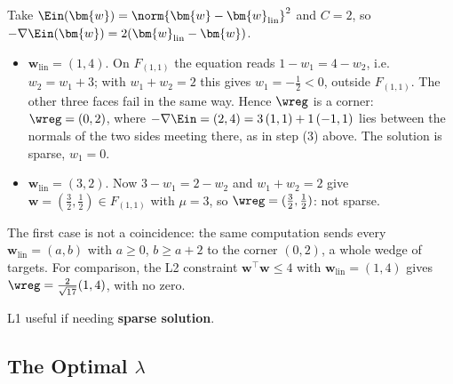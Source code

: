 \begin{eg}
    Take \(\Ein(\bm{w}) = \norm{\bm{w} - \bm{w}_{\mathrm{lin}}}^2\) and \(C =
    2\), so \(-\nabla \Ein(\bm{w}) = 2(\bm{w}_{\mathrm{lin}} - \bm{w})\).
    \begin{itemize}
        \item \(\bm{w}_{\mathrm{lin}} = (1, 4)\). On \(F_{(1,1)}\) the equation
            reads \(1 - w_1 = 4 - w_2\), i.e.\ \(w_2 = w_1 + 3\); with \(w_1 +
            w_2 = 2\) this gives \(w_1 = -\frac{1}{2} < 0\), outside
            \(F_{(1,1)}\). The other three faces fail in the same way. Hence
            \(\wreg\) is a corner: \(\wreg = (0, 2)\), where \(-\nabla \Ein =
            (2, 4) = 3\,(1, 1) + 1\,(-1, 1)\) lies between the normals of the
            two sides meeting there, as in step (3) above. The solution is
            sparse, \(w_1 = 0\).
        \item \(\bm{w}_{\mathrm{lin}} = (3, 2)\). Now \(3 - w_1 = 2 - w_2\)
            and \(w_1 + w_2 = 2\) give \(\bm{w} = (\frac{3}{2}, \frac{1}{2})
            \in F_{(1,1)}\) with \(\mu = 3\), so \(\wreg = (\frac{3}{2},
            \frac{1}{2})\): not sparse.
    \end{itemize}
    The first case is not a coincidence: the same computation sends every
    \(\bm{w}_{\mathrm{lin}} = (a, b)\) with \(a \ge 0\), \(b \ge a + 2\) to
    the corner \((0, 2)\), a whole wedge of targets. For comparison, the L2
    constraint \(\bm{w}^\top \bm{w} \le 4\) with \(\bm{w}_{\mathrm{lin}} = (1,
    4)\) gives \(\wreg = \frac{2}{\sqrt{17}}(1, 4)\), with no zero.
\end{eg}

\begin{moral}
    L1 useful if needing \textbf{sparse solution}.
\end{moral}

\subsection{The Optimal \texorpdfstring{\(\lambda\)}{lambda}}


